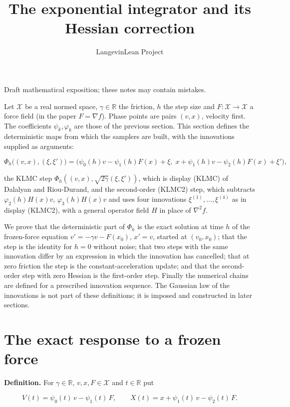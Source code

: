 \documentclass[11pt,a4paper]{article}
\title{\texorpdfstring{The exponential integrator and its Hessian correction}{The exponential integrator and its Hessian correction}}
\author{LangevinLean Project}
\date{}
\begin{document}
\maketitle
Draft mathematical exposition; these notes may contain mistakes.


Let \(\mathcal X\) be a real normed space, \(\gamma\in\mathbb R\) the friction, \(h\) the step size and \(F:\mathcal X\to\mathcal X\) a force field (in the paper \(F=\nabla f\)). Phase points are pairs \((v,x)\), velocity first. The coefficients \(\psi_k,\varphi_k\) are those of the previous section. This section defines the deterministic maps from which the samplers are built, with the innovations supplied as arguments:


\[\Phi_h\bigl((v,x),(\xi,\xi')\bigr)=\bigl(\psi_0(h)v-\psi_1(h)F(x)+\xi,\;x+\psi_1(h)v-\psi_2(h)F(x)+\xi'\bigr),\]


the KLMC step \(\Phi_h((v,x),\sqrt{2\gamma}(\xi,\xi'))\), which is display (KLMC) of Dalalyan and Riou-Durand, and the second-order (KLMC2) step, which subtracts \(\varphi_2(h)H(x)v\), \(\varphi_3(h)H(x)v\) and uses four innovations \(\xi^{(1)},\dots,\xi^{(4)}\) as in display (KLMC2), with a general operator field \(H\) in place of \(\nabla^2f\).




We prove that the deterministic part of \(\Phi_h\) is the exact solution at time \(h\) of the frozen-force equation \(v'=-\gamma v-F(x_0)\), \(x'=v\), started at \((v_0,x_0)\); that the step is the identity for \(h=0\) without noise; that two steps with the same innovation differ by an expression in which the innovation has cancelled; that at zero friction the step is the constant-acceleration update; and that the second-order step with zero Hessian is the first-order step. Finally the numerical chains are defined for a prescribed innovation sequence. The Gaussian law of the innovations is not part of these definitions; it is imposed and constructed in later sections.


\section{\texorpdfstring{The exact response to a frozen force}{The exact response to a frozen force}}


\textbf{Definition.} For \(\gamma\in\mathbb R\), \(v,x,F\in\mathcal X\) and \(t\in\mathbb R\) put


\[V(t)=\psi_0(t)\,v-\psi_1(t)\,F,\qquad X(t)=x+\psi_1(t)\,v-\psi_2(t)\,F .\]
\end{document}
